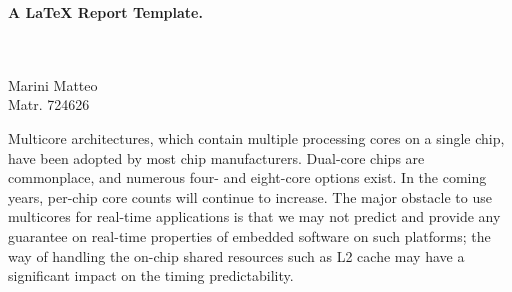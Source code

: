 \documentclass[a4paper,10pt]{article}
\newenvironment*{mytitle}{\begin{LARGE}\bf}{\end{LARGE}\\[1.5ex]}%
\begin{document}
\begin{mytitle} A LaTeX Report Template. \end{mytitle}
%
%
\\
Marini Matteo\\
Matr. 724626\\
\hspace{10ex}

Multicore architectures, which contain multiple processing cores on a single chip, have been adopted by most chip manufacturers.
Dual-core chips are commonplace, and numerous four- and eight-core options exist. In the coming years, per-chip core counts will continue to increase.
The major obstacle to use multicores for real-time applications is that we may not predict and provide any guarantee on real-time properties 
of embedded software on such platforms; the way of handling the on-chip shared resources such as L2 cache may have a significant impact on the timing
predictability.
\end{document}
